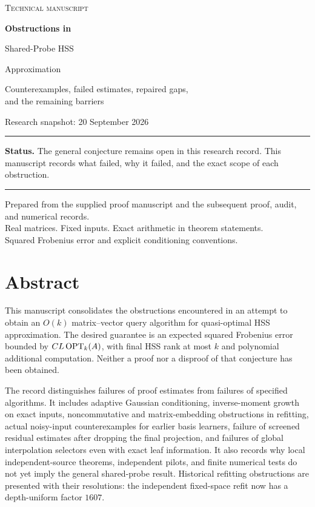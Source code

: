\documentclass[11pt,oneside,openany,a4paper]{report}
\numberwithin{equation}{chapter}
\theoremstyle{definition}
\theoremstyle{remark}
\begin{document}
\hypersetup{pageanchor=false}
\begin{titlepage}
\vspace*{10mm}
{\color{inkblue}\large\scshape Technical manuscript\par}
\vspace{17mm}
{\color{inkblue}\Huge\bfseries Obstructions in\par Shared-Probe HSS\par Approximation\par}
\vspace{9mm}
{\Large\raggedright Counterexamples, failed estimates, repaired gaps,\\ and the remaining barriers\par}
\vspace{13mm}
{\large Research snapshot: 20 September 2026\par}
\vspace{15mm}
\hrule\vspace{5mm}
\textbf{Status.} The general conjecture remains open in this research record. This manuscript records what failed, why it failed, and the exact scope of each obstruction.
\vspace{5mm}\hrule
\vfill
Prepared from the supplied proof manuscript and the subsequent proof,
audit, and numerical records.\\[4pt]
Real matrices. Fixed inputs. Exact arithmetic in theorem statements.\\
Squared Frobenius error and explicit conditioning conventions.
\end{titlepage}
\hypersetup{pageanchor=true}
\chapter*{Abstract}
This manuscript consolidates the obstructions encountered in an attempt to obtain an $O(k)$ matrix--vector query algorithm for quasi-optimal HSS approximation. The desired guarantee is an expected squared Frobenius error bounded by $C L\operatorname{OPT}_k(A)$, with final HSS rank at most $k$ and polynomial additional computation. Neither a proof nor a disproof of that conjecture has been obtained.

The record distinguishes failures of proof estimates from failures of specified algorithms. It includes adaptive Gaussian conditioning, inverse-moment growth on exact inputs, noncommutative and matrix-embedding obstructions in refitting, actual noisy-input counterexamples for earlier basis learners, failure of screened residual estimates after dropping the final projection, and failures of global interpolation selectors even with exact leaf information. It also records why local independent-source theorems, independent pilots, and finite numerical tests do not yet imply the general shared-probe result. Historical refitting obstructions are presented with their resolutions: the independent fixed-space refit now has a depth-uniform factor $1607$.
\end{document}
